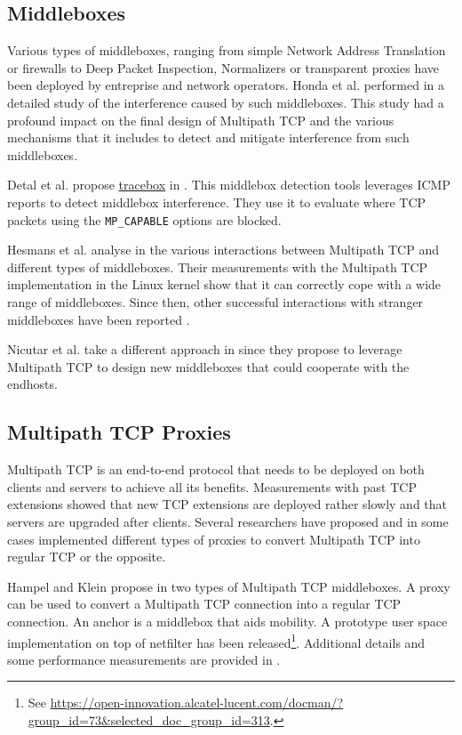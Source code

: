 \subsection{Middleboxes}

Various types of middleboxes, ranging from simple Network Address Translation or firewalls to Deep Packet Inspection, Normalizers or transparent proxies have been deployed by entreprise and network operators. Honda et al. performed in \cite{Honda_Extend:2011} a detailed study of the interference caused by such middleboxes. This study had a profound impact on the final design of Multipath TCP and the various mechanisms that it includes to detect and mitigate interference from such middleboxes.

Detal et al. propose \href{http://tracebox.org}{tracebox} in \cite{Detal_tracebox:2013}. This middlebox detection tools leverages ICMP reports to detect middlebox interference. They use it to evaluate where TCP packets using the \texttt{MP\_CAPABLE} options are blocked.

Hesmans et al. analyse in \cite{Hesmans_Extensions:2013} the various interactions between Multipath TCP and different types of middleboxes. Their measurements with the Multipath TCP implementation in the Linux kernel show that it can correctly cope with a wide range of middleboxes. Since then, other successful interactions with stranger middleboxes have been reported \cite{draft-ietf-mptcp-experience}.

Nicutar et al. take a different approach in \cite{Nicutar_Acrobatics:2013} since they propose to leverage Multipath TCP to design new middleboxes that could cooperate with the endhosts.

\subsection{Multipath TCP Proxies}

Multipath TCP is an end-to-end protocol that needs to be deployed on both clients and servers to achieve all its benefits.
Measurements with past TCP extensions showed that new TCP extensions are deployed rather slowly and that servers are
upgraded after clients. Several researchers have proposed
and in some cases implemented different types of proxies to convert Multipath TCP into regular TCP or the opposite.

Hampel and Klein propose in \cite{draft-hampel-mptcp-proxies-anchors} two types of Multipath TCP middleboxes. A proxy can be used to convert a Multipath TCP 
connection into a regular TCP connection. An anchor is a middlebox that aids mobility.  
A prototype user space implementation on top of netfilter has been released\footnote{See \url{https://open-innovation.alcatel-lucent.com/docman/?group_id=73&selected_doc_group_id=313}.}. Additional details and some performance measurements are provided in \cite{Hampel_Seamless:2013}.

